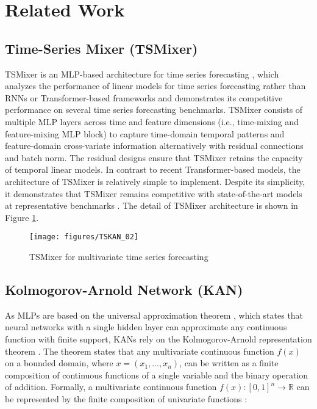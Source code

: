 \section{Related Work}
\subsection{Time-Series Mixer (TSMixer)}
TSMixer is an MLP-based architecture for time series forecasting \cite{chen2023tsmixer}, which analyzes the performance of linear models for time series forecasting rather than RNNs or Transformer-based frameworks and demonstrates its competitive performance on several time series forecasting benchmarks. TSMixer consists of multiple MLP layers across time and feature dimensions (i.e., time-mixing and feature-mixing MLP block) to capture time-domain temporal patterns and feature-domain cross-variate information alternatively with residual connections and batch norm. The residual designs ensure that TSMixer retains the capacity of temporal linear models. In contrast to recent Transformer-based models, the architecture of TSMixer is relatively simple to implement. Despite its simplicity, it demonstrates that TSMixer remains competitive with state-of-the-art models at representative benchmarks \cite{chen2023tsmixer}. The detail of TSMixer architecture is shown in Figure \ref{figure:TSMixer}.

\begin{figure}[htbp]
\centering
\texttt{[image: figures/TSKAN\_02]}
\caption{TSMixer for multivariate time series forecasting \cite{chen2023tsmixer}}
\label{figure:TSMixer}
\end{figure}

\subsection{Kolmogorov-Arnold Network (KAN)}
As MLPs are based on the universal approximation theorem \cite{cybenko1989approximation}, which states that neural networks with a single hidden layer can approximate any continuous function with finite support, KANs rely on the Kolmogorov-Arnold representation theorem \cite{arnold2009functions, arnold2009representation}. The theorem states that any multivariate continuous function $f(x)$ on a bounded domain, where $x=(x_{1}, \dots, x_{n})$, can be written as a finite composition of continuous functions of a single variable and the binary operation of addition. Formally, a multivariate continuous function $f(x) : [0,1]^{n} \rightarrow \mathbb{R}$ can be represented by the finite composition of univariate functions \cite{liu2024kan}:

